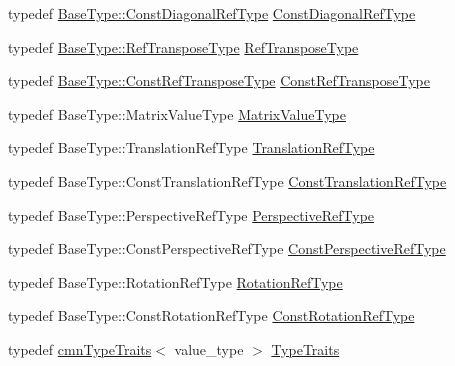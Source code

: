 \begin{DoxyCompactItemize}
\item 
typedef \hyperlink{classvct_frame4x4_const_base_a83c846e0b484264c6d71c101b67d164a}{Base\+Type\+::\+Const\+Diagonal\+Ref\+Type} \hyperlink{classvct_frame4x4_base_ae8ff29e1d404cc75dd2163bf99446d90}{Const\+Diagonal\+Ref\+Type}
\item 
typedef \hyperlink{classvct_frame4x4_const_base_a1cedffcdbf60e8ec01a0a61d6ceb24b7}{Base\+Type\+::\+Ref\+Transpose\+Type} \hyperlink{classvct_frame4x4_base_aee8d584095f21f29903fe8a8b62fb9c6}{Ref\+Transpose\+Type}
\item 
typedef \hyperlink{classvct_frame4x4_const_base_acac151b2d8a361ed229d8cdacac2b01f}{Base\+Type\+::\+Const\+Ref\+Transpose\+Type} \hyperlink{classvct_frame4x4_base_a1f3226ad5b15ec1edb95cfe760eacc4f}{Const\+Ref\+Transpose\+Type}
\item 
typedef Base\+Type\+::\+Matrix\+Value\+Type \hyperlink{classvct_frame4x4_base_a46b60268d306fa5edcfc229da61501ca}{Matrix\+Value\+Type}
\item 
typedef Base\+Type\+::\+Translation\+Ref\+Type \hyperlink{classvct_frame4x4_base_a0450063a4ebdf0f0c87c7f3fa789a17f}{Translation\+Ref\+Type}
\item 
typedef Base\+Type\+::\+Const\+Translation\+Ref\+Type \hyperlink{classvct_frame4x4_base_a720869bcd28db8ef2f9f13294097e99e}{Const\+Translation\+Ref\+Type}
\item 
typedef Base\+Type\+::\+Perspective\+Ref\+Type \hyperlink{classvct_frame4x4_base_a445582cef7ba9f03553b1d9e63a2d64c}{Perspective\+Ref\+Type}
\item 
typedef Base\+Type\+::\+Const\+Perspective\+Ref\+Type \hyperlink{classvct_frame4x4_base_a47161d0a7598341722759640af9413e5}{Const\+Perspective\+Ref\+Type}
\item 
typedef Base\+Type\+::\+Rotation\+Ref\+Type \hyperlink{classvct_frame4x4_base_a57cec1ba52b9787d77da60fb020c1999}{Rotation\+Ref\+Type}
\item 
typedef Base\+Type\+::\+Const\+Rotation\+Ref\+Type \hyperlink{classvct_frame4x4_base_a427cd6a2c5f48f68fde733a9b51a83e3}{Const\+Rotation\+Ref\+Type}
\item 
typedef \hyperlink{classcmn_type_traits}{cmn\+Type\+Traits}$<$ value\+\_\+type $>$ \hyperlink{classvct_frame4x4_base_ac03fa3e28721aea50a67d65e86963bd7}{Type\+Traits}
\end{DoxyCompactItemize}
